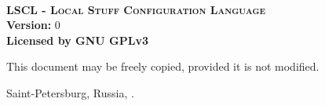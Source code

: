 \begin{titlepage}
	\begin{center}
		~\\
		\vspace{5cm}
		
		\textsc{\bf \LARGE LSCL - Local Stuff Configuration Language}\\[5mm]
		
		{ \Large
			{\bf Version:} 0 \\[2mm]
			{\bf Licensed 	by GNU GPLv3}
		}
		\bigskip
	\end{center}
	
	\vfill
	
	\hfill
	\begin{minipage}{0.4\linewidth}
		This document may be freely copied, provided it is not modified.
	\end{minipage}
	\vfill

	\begin{center}
		Saint-Petersburg, Russia, \the\year .
	\end{center}
\end{titlepage}
